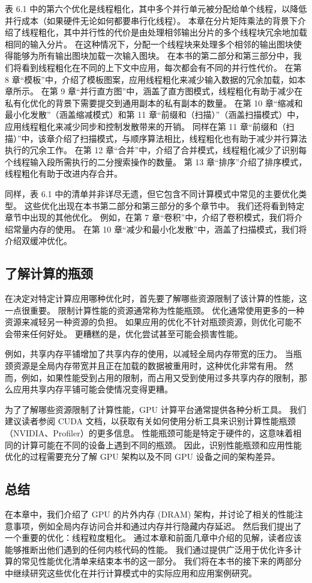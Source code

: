 表 6.1 中的第六个优化是线程粗化，其中多个并行单元被分配给单个线程，以降低并行成本（如果硬件无论如何都要串行化线程）。 本章在分片矩阵乘法的背景下介绍了线程粗化，其中并行性的代价是由处理相邻输出分片的多个线程块冗余地加载相同的输入分片。 在这种情况下，分配一个线程块来处理多个相邻的输出图块使得能够为所有输出图块加载一次输入图块。 在本书的第二部分和第三部分中，我们将看到线程粗化在不同的上下文中应用，每次都会有不同的并行性代价。 在第 8 章“模板”中，介绍了模板图案，应用线程粗化来减少输入数据的冗余加载，如本章所示。 在第 9 章“并行直方图”中，涵盖了直方图模式，线程粗化有助于减少在私有化优化的背景下需要提交到通用副本的私有副本的数量。 在第 10 章“缩减和最小化发散”（涵盖缩减模式）和第 11 章“前缀和（扫描）”（涵盖扫描模式）中，应用线程粗化来减少同步和控制发散带来的开销。 同样在第 11 章“前缀和（扫描）”中，该章介绍了扫描模式，与顺序算法相比，线程粗化也有助于减少并行算法执行的冗余工作。 在第 12 章“合并”中，介绍了合并模式，线程粗化减少了识别每个线程输入段所需执行的二分搜索操作的数量。 第 13 章“排序”介绍了排序模式，线程粗化有助于改进内存合并。

同样，表 6.1 中的清单并非详尽无遗，但它包含不同计算模式中常见的主要优化类型。 这些优化出现在本书第二部分和第三部分的多个章节中。 我们还将看到特定章节中出现的其他优化。 例如，在第 7 章“卷积”中，介绍了卷积模式，我们将介绍常量内存的使用。 在第 10 章“减少和最小化发散”中，涵盖了扫描模式，我们将介绍双缓冲优化。

\subsection{了解计算的瓶颈}
在决定对特定计算应用哪种优化时，首先要了解哪些资源限制了该计算的性能，这一点很重要。 限制计算性能的资源通常称为性能瓶颈。 优化通常使用更多的一种资源来减轻另一种资源的负担。 如果应用的优化不针对瓶颈资源，则优化可能不会带来任何好处。 更糟糕的是，优化尝试甚至可能会损害性能。

例如，共享内存平铺增加了共享内存的使用，以减轻全局内存带宽的压力。 当瓶颈资源是全局内存带宽并且正在加载的数据被重用时，这种优化非常有用。 然而，例如，如果性能受到占用的限制，而占用又受到使用过多共享内存的限制，那么应用共享内存平铺可能会使情况变得更糟。

为了了解哪些资源限制了计算性能，GPU 计算平台通常提供各种分析工具。 我们建议读者参阅 CUDA 文档，以获取有关如何使用分析工具来识别计算性能瓶颈（NVIDIA、Profiler）的更多信息。 性能瓶颈可能是特定于硬件的，这意味着相同的计算可能在不同的设备上遇到不同的瓶颈。 因此，识别性能瓶颈和应用性能优化的过程需要充分了解 GPU 架构以及不同 GPU 设备之间的架构差异。

\subsection{总结}
在本章中，我们介绍了 GPU 的片外内存 (DRAM) 架构，并讨论了相关的性能注意事项，例如全局内存访问合并和通过内存并行隐藏内存延迟。 然后我们提出了一个重要的优化：线程粒度粗化。 通过本章和前面几章中介绍的见解，读者应该能够推断出他们遇到的任何内核代码的性能。 我们通过提供广泛用于优化许多计算的常见性能优化清单来结束本书的这一部分。 我们将在本书的接下来的两部分中继续研究这些优化在并行计算模式中的实际应用和应用案例研究。
